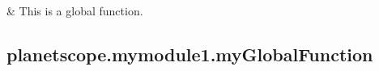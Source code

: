 \documentclass[letterpaper,10pt,english]{sphinxmanual}
\begin{document}
\begin{savenotes}\sphinxatlongtablestart\begin{longtable}[c]{}
\hline

\endfirsthead

%
{}\\
\hline

\endhead

\hline
{}\\
\endfoot

\endlastfoot

\sphinxAtStartPar
{\hyperref[\detokenize{_autosummary/planetscope.mymodule1.myGlobalFunction:planetscope.mymodule1.myGlobalFunction}]{}}
&
\sphinxAtStartPar
This is a global function.
\\
\hline
\end{longtable}\sphinxatlongtableend\end{savenotes}


\subsection{planetscope.mymodule1.myGlobalFunction}
\label{\detokenize{_autosummary/planetscope.mymodule1.myGlobalFunction:planetscope-mymodule1-myglobalfunction}}\label{\detokenize{_autosummary/planetscope.mymodule1.myGlobalFunction::doc}}
\end{document}
